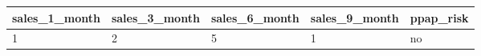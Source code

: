 \begin{tabular}{m{2cm}m{2cm}m{2cm}m{2cm}m{2cm}}
\toprule
 sales\_1\_month &  sales\_3\_month &  sales\_6\_month &  sales\_9\_month & ppap\_risk \\
\midrule
             1 &              2 &              5 &              1 &        no \\
\bottomrule
\end{tabular}
